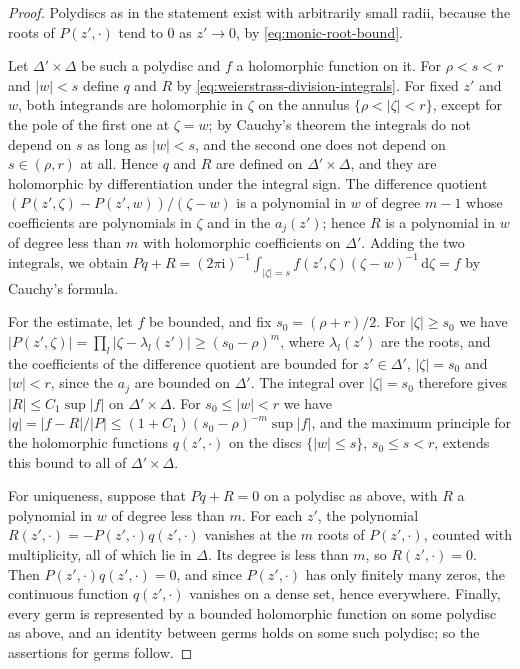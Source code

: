 \begin{proof}
Polydiscs as in the statement exist with arbitrarily small radii, because the roots of $P(z',\cdot)$ tend to $0$ as $z'\to0$, by \eqref{eq:monic-root-bound}.

Let $\Delta'\times\Delta$ be such a polydisc and $f$ a holomorphic function on it. For $\rho<s<r$ and $|w|<s$ define $q$ and $R$ by \eqref{eq:weierstrass-division-integrals}. For fixed $z'$ and $w$, both integrands are holomorphic in $\zeta$ on the annulus $\{\rho<|\zeta|<r\}$, except for the pole of the first one at $\zeta=w$; by Cauchy's theorem the integrals do not depend on $s$ as long as $|w|<s$, and the second one does not depend on $s\in(\rho,r)$ at all. Hence $q$ and $R$ are defined on $\Delta'\times\Delta$, and they are holomorphic by differentiation under the integral sign. The difference quotient $(P(z',\zeta)-P(z',w))/(\zeta-w)$ is a polynomial in $w$ of degree $m-1$ whose coefficients are polynomials in $\zeta$ and in the $a_j(z')$; hence $R$ is a polynomial in $w$ of degree less than $m$ with holomorphic coefficients on $\Delta'$. Adding the two integrals, we obtain $Pq+R=(2\pi\mathrm i)^{-1}\int_{|\zeta|=s}f(z',\zeta)(\zeta-w)^{-1}\,\mathrm d\zeta=f$ by Cauchy's formula.

For the estimate, let $f$ be bounded, and fix $s_0=(\rho+r)/2$. For $|\zeta|\geq s_0$ we have $|P(z',\zeta)|=\prod_l|\zeta-\lambda_l(z')|\geq(s_0-\rho)^m$, where $\lambda_l(z')$ are the roots, and the coefficients of the difference quotient are bounded for $z'\in\Delta'$, $|\zeta|=s_0$ and $|w|<r$, since the $a_j$ are bounded on $\Delta'$. The integral over $|\zeta|=s_0$ therefore gives $|R|\leq C_1\sup|f|$ on $\Delta'\times\Delta$. For $s_0\leq|w|<r$ we have $|q|=|f-R|/|P|\leq(1+C_1)(s_0-\rho)^{-m}\sup|f|$, and the maximum principle for the holomorphic functions $q(z',\cdot)$ on the discs $\{|w|\leq s\}$, $s_0\leq s<r$, extends this bound to all of $\Delta'\times\Delta$.

For uniqueness, suppose that $Pq+R=0$ on a polydisc as above, with $R$ a polynomial in $w$ of degree less than $m$. For each $z'$, the polynomial $R(z',\cdot)=-P(z',\cdot)q(z',\cdot)$ vanishes at the $m$ roots of $P(z',\cdot)$, counted with multiplicity, all of which lie in $\Delta$. Its degree is less than $m$, so $R(z',\cdot)=0$. Then $P(z',\cdot)q(z',\cdot)=0$, and since $P(z',\cdot)$ has only finitely many zeros, the continuous function $q(z',\cdot)$ vanishes on a dense set, hence everywhere. Finally, every germ is represented by a bounded holomorphic function on some polydisc as above, and an identity between germs holds on some such polydisc; so the assertions for germs follow.
\end{proof}

